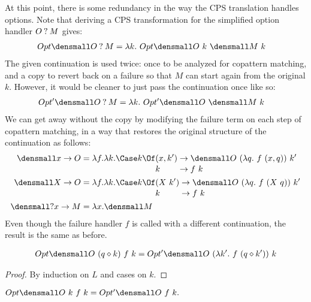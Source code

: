 \documentclass[sigplan,screen]{acmart}
\begin{document}
At this point, there is some redundancy in the way the CPS translation handles
options.  Note that deriving a CPS transformation for the simplified option
handler $O \mathbin{?} M$ gives:
\begin{align*}
  Opt\den{O \ask M} &= \lambda k.~ Opt\den{O} ~ k ~ \den{M} ~ k
\end{align*}
The given continuation is used twice: once to be analyzed for copattern
matching, and a copy to revert back on a failure so that $M$ can start again
from the original $k$.  However, it would be cleaner to just pass the
continuation once like so:
\begin{align*}
  Opt'\den{O \ask M} &= \lambda k.~ Opt'\den{O} ~ \den{M} ~ k
\end{align*}
We can get away without the copy by modifying the failure term on each step of
copattern matching, in a way that restores the original structure of the
continuation as follows:
\begin{align*}
  \den{x \to O}
  &=
  \lambda f. \lambda k.
  \Case k \Of
  \begin{alignedat}[t]{2}
    &(x, k') &&\to \den{O} ~ (\lambda q.~ f ~ (x, q)) ~ k'
    \\[-0.5ex]
    &k &&\to f ~ k
  \end{alignedat}
  \\
  \den{X \to O}
  &=
  \lambda f. \lambda k.
  \Case k \Of
  \begin{alignedat}[t]{2}
    &(X ~ k') &&\to \den{O} ~ (\lambda q.~ f ~ (X ~ q)) ~ k'
    \\[-0.5ex]
    &k &&\to f ~ k
  \end{alignedat}
  \\
  \den{\ask x \to M}
  &=
  \lambda x. \den{M}
\end{align*}
Even though the failure handler $f$ is called with a different continuation, the
result is the same as before.
\begin{lemma}
  \begin{align*}
    Opt\den{O} ~ (q \compq k) ~ f ~ k
    =
    Opt'\den{O} ~ (\lambda k'.~ f ~ (q \compq k')) ~ k
  \end{align*}
\end{lemma}
\begin{proof}
  By induction on $L$ and cases on $k$.
\end{proof}
\begin{corollary}
  \begin{math}
    Opt\den{O} ~ k ~ f ~ k
    =
    Opt'\den{O} ~ f ~ k
    .
  \end{math}
\end{corollary}
\end{document}
